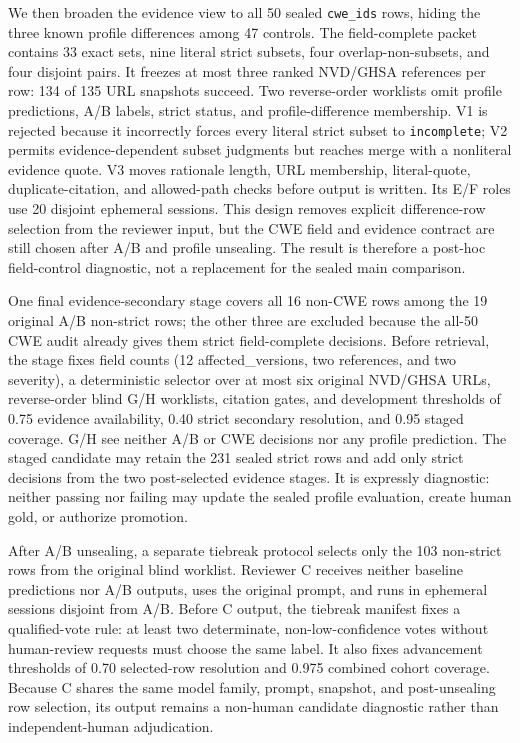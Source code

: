 We then broaden the evidence view to all 50 sealed \texttt{cwe\_ids} rows, hiding the three known profile differences among 47 controls. The field-complete packet contains 33 exact sets, nine literal strict subsets, four overlap-non-subsets, and four disjoint pairs. It freezes at most three ranked NVD/GHSA references per row: 134 of 135 URL snapshots succeed. Two reverse-order worklists omit profile predictions, A/B labels, strict status, and profile-difference membership. V1 is rejected because it incorrectly forces every literal strict subset to \texttt{incomplete}; V2 permits evidence-dependent subset judgments but reaches merge with a nonliteral evidence quote. V3 moves rationale length, URL membership, literal-quote, duplicate-citation, and allowed-path checks before output is written. Its E/F roles use 20 disjoint ephemeral sessions. This design removes explicit difference-row selection from the reviewer input, but the CWE field and evidence contract are still chosen after A/B and profile unsealing. The result is therefore a post-hoc field-control diagnostic, not a replacement for the sealed main comparison.

One final evidence-secondary stage covers all 16 non-CWE rows among the 19 original A/B non-strict rows; the other three are excluded because the all-50 CWE audit already gives them strict field-complete decisions. Before retrieval, the stage fixes field counts (12 affected\_versions, two references, and two severity), a deterministic selector over at most six original NVD/GHSA URLs, reverse-order blind G/H worklists, citation gates, and development thresholds of 0.75 evidence availability, 0.40 strict secondary resolution, and 0.95 staged coverage. G/H see neither A/B or CWE decisions nor any profile prediction. The staged candidate may retain the 231 sealed strict rows and add only strict decisions from the two post-selected evidence stages. It is expressly diagnostic: neither passing nor failing may update the sealed profile evaluation, create human gold, or authorize promotion.

After A/B unsealing, a separate tiebreak protocol selects only the 103 non-strict rows from the original blind worklist. Reviewer C receives neither baseline predictions nor A/B outputs, uses the original prompt, and runs in ephemeral sessions disjoint from A/B. Before C output, the tiebreak manifest fixes a qualified-vote rule: at least two determinate, non-low-confidence votes without human-review requests must choose the same label. It also fixes advancement thresholds of 0.70 selected-row resolution and 0.975 combined cohort coverage. Because C shares the same model family, prompt, snapshot, and post-unsealing row selection, its output remains a non-human candidate diagnostic rather than independent-human adjudication.

